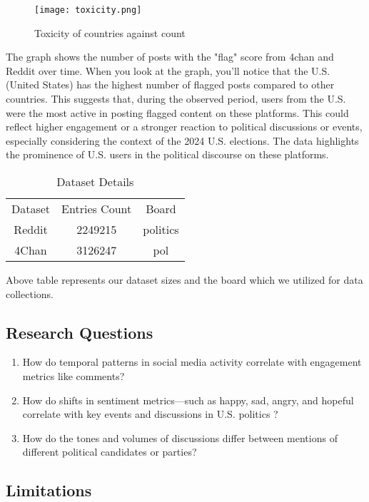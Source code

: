 \documentclass[sigconf]{acmart}
\begin{document}
\begin{figure}[h]
    \texttt{[image: toxicity.png]}
    \caption{Toxicity of countries against count}
    \label{fig:hourly_comments}
    \end{figure}
    The graph shows the number of posts with the "flag" score from 4chan and Reddit over time. When you look at the graph, you'll notice that the U.S. (United States) has the highest number of flagged posts compared to other countries. This suggests that, during the observed period, users from the U.S. were the most active in posting flagged content on these platforms. This could reflect higher engagement or a stronger reaction to political discussions or events, especially considering the context of the 2024 U.S. elections. The data highlights the prominence of U.S. users in the political discourse on these platforms.


\begin{table}
    \centering
    \begin{tabular}{ccc}
       Dataset & Entries Count & Board&\\
       Reddit  & 2249215 & politics&\\
       4Chan  & 3126247 & pol &\\
    \end{tabular}
    \caption{Dataset Details}
    \label{tab:my_label}
\end{table}
Above table represents our dataset sizes and the board which we utilized for data collections.


\subsection{Research Questions}
\begin{enumerate}
     \item How do temporal patterns in social media activity correlate with engagement metrics like comments?
    \item How do shifts in sentiment metrics—such as happy, sad, angry, and hopeful correlate with key events and discussions in U.S. politics ?
    \item How do the tones and volumes of discussions differ between mentions of different political candidates or parties?
\end{enumerate}




\subsection{Limitations}
\end{document}
